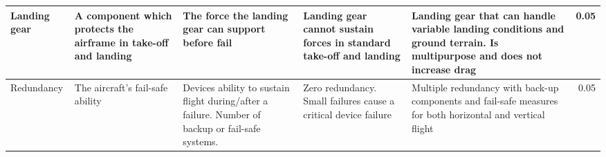 \begin{table}[]
{\begin{tabular}{|p{2cm}|p{4cm}|p{4cm}|p{4cm}|p{4cm}|r|}
Landing gear                                  & A component which protects the airframe in take-off and landing                                          & The force the landing gear can support before fail                                                                                                          & Landing gear cannot sustain forces in standard take-off and landing & Landing gear that can handle variable landing conditions and ground terrain. Is multipurpose and does not increase drag & 0.05      \\ \hline
Redundancy                                    & The aircraft's fail-safe ability                                                                           & Devices ability to sustain flight during/after a failure. Number of backup or fail-safe systems.                                                            & Zero redundancy. Small failures cause a critical device failure     & Multiple redundancy with back-up components and fail-safe measures for both horizontal and vertical flight              & 0.05      \\ \hline
\end{tabular}%
}
\end{table}




